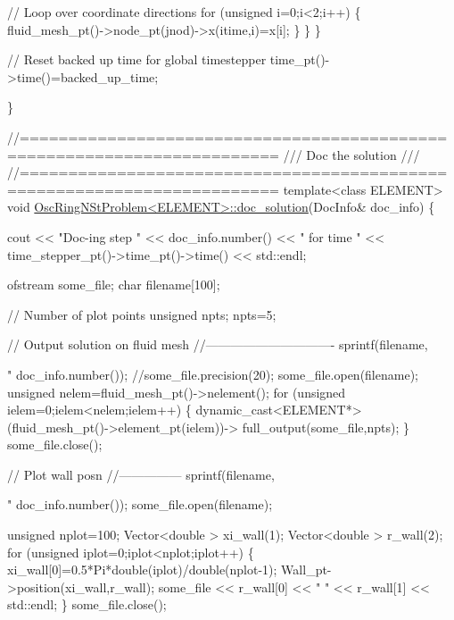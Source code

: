 \begin{DoxyCodeInclude}
     \textcolor{comment}{// Loop over coordinate directions}
     \textcolor{keywordflow}{for} (\textcolor{keywordtype}{unsigned} i=0;i<2;i++)
      \{
       fluid\_mesh\_pt()->node\_pt(jnod)->x(itime,i)=x[i];
      \}
    \} 
  \}

 \textcolor{comment}{// Reset backed up time for global timestepper}
 time\_pt()->time()=backed\_up\_time;

\}





\textcolor{comment}{//========================================================================}\textcolor{comment}{}
\textcolor{comment}{/// Doc the solution}
\textcolor{comment}{///}
\textcolor{comment}{}\textcolor{comment}{//========================================================================}
\textcolor{keyword}{template}<\textcolor{keyword}{class} ELEMENT>
\textcolor{keywordtype}{void} \hyperlink{classOscRingNStProblem_a7de5df21c2179db1c97cc83332dcc82c}{OscRingNStProblem<ELEMENT>::doc\_solution}(DocInfo& doc\_info)
\{ 

 cout << \textcolor{stringliteral}{"Doc-ing step "} <<  doc\_info.number()
      << \textcolor{stringliteral}{" for time "} << time\_stepper\_pt()->time\_pt()->time() << std::endl;

 ofstream some\_file;
 \textcolor{keywordtype}{char} filename[100];

 \textcolor{comment}{// Number of plot points}
 \textcolor{keywordtype}{unsigned} npts;
 npts=5; 


 \textcolor{comment}{// Output solution on fluid mesh}
 \textcolor{comment}{//-------------------------------}
 sprintf(filename,\textcolor{stringliteral}{"%
         doc\_info.number());
 \textcolor{comment}{//some\_file.precision(20);}
 some\_file.open(filename);
 \textcolor{keywordtype}{unsigned} nelem=fluid\_mesh\_pt()->nelement();
 \textcolor{keywordflow}{for} (\textcolor{keywordtype}{unsigned} ielem=0;ielem<nelem;ielem++)
  \{
   \textcolor{keyword}{dynamic\_cast<}ELEMENT*\textcolor{keyword}{>}(fluid\_mesh\_pt()->element\_pt(ielem))->
    full\_output(some\_file,npts);
  \}
 some\_file.close();
  

 \textcolor{comment}{// Plot wall posn}
 \textcolor{comment}{//---------------}
 sprintf(filename,\textcolor{stringliteral}{"%
         doc\_info.number());
 some\_file.open(filename);
 
 \textcolor{keywordtype}{unsigned} nplot=100;
 Vector<double > xi\_wall(1);
 Vector<double > r\_wall(2);
  \textcolor{keywordflow}{for} (\textcolor{keywordtype}{unsigned} iplot=0;iplot<nplot;iplot++)
   \{
    xi\_wall[0]=0.5*Pi*double(iplot)/double(nplot-1);
    Wall\_pt->position(xi\_wall,r\_wall);
    some\_file << r\_wall[0] << \textcolor{stringliteral}{" "} << r\_wall[1] << std::endl;
   \}
  some\_file.close();


}}
\end{DoxyCodeInclude}
